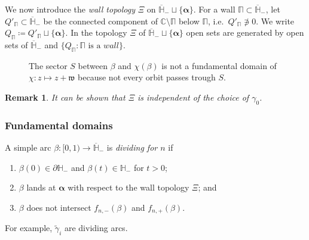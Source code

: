 \documentclass{amsart}
\newcommand{\1}{{\mathbb 1 }}
\newcommand{\bPi}{{\mathbb{\Pi}}}
\newcommand{\ww}{\mathfrak{w}}
\newcommand\wgamma{{\widetilde \gamma}}
\newcommand{\C}{\mathbb{C}}
\renewcommand{\H}{\mathbb{H}}
\newcommand{\oH}{\overline {\mathbb{H}}}
\newtheorem{rem}[thm]{Remark}
\theoremstyle{remark}
\numberwithin{equation}{section}
\theoremstyle{definition}
\newcommand{\balpha}{{\boldsymbol \alpha}}
\theoremstyle{nonumberbreak}
\begin{document}
We now introduce the \emph{wall topology} $\Xi$ on $\oH_-\sqcup \{\balpha\}$. For a wall $\bPi\subset \oH_-$, let $Q'_{\bPi}\subset \oH_-$ be the connected component of $\C\setminus \bPi$ below $\bPi$, i.e.~$Q'_{\bPi}\not\ni 0$. We write $Q_{\bPi}\coloneqq Q'_{\bPi} \sqcup \{\balpha\}$. In the topology $\Xi$ of $\oH_-\sqcup \{\balpha\}$ open sets are generated by open sets of $\oH_-$ and $\{Q_{\bPi} \colon {\bPi\text{ is a }wall}\}$. 
 
 

\begin{figure}
\caption{The sector $S$ between $\beta$ and $\chi(\beta)$ is not a fundamental domain of $\chi\colon z\mapsto z+\ww$ because not every orbit passes trough $S$.}
\end{figure}

\begin{rem} It can be shown that $\Xi$ is independent of the choice of $\gamma_0$. 
\end{rem} 
 
 

\subsubsection{Fundamental domains}
A simple arc $\beta\colon [0,1)\to \oH_-$ is \emph{dividing for $n$} if 
\begin{enumerate}
\item $\beta (0)\in \partial \H_-$ and $\beta(t)\in \H_-$ for $t>0$;
\item $\beta$ lands at $\balpha$ with respect to the wall topology $\Xi$; and\label{case:beta lands}
\item $\beta$ does not intersect $f_{n,-}(\beta)$ and $f_{n,+}(\beta)$.
\end{enumerate}For example, $\wgamma_i$ are dividing arcs. 
\end{document}
